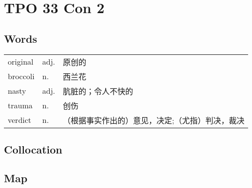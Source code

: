 \section{TPO 33 Con 2}

\subsection{Words}

\begin{tabular}{lll}
    original & adj. & 原创的                      \\
    broccoli & n.   & 西兰花                      \\
    nasty    & adj. & 肮脏的；令人不快的                \\
    trauma   & n.   & 创伤                       \\
    verdict  & n.   & （根据事实作出的）意见，决定;（尤指）判决，裁决 \\
\end{tabular}

\subsection{Collocation}

\subsection{Map}
